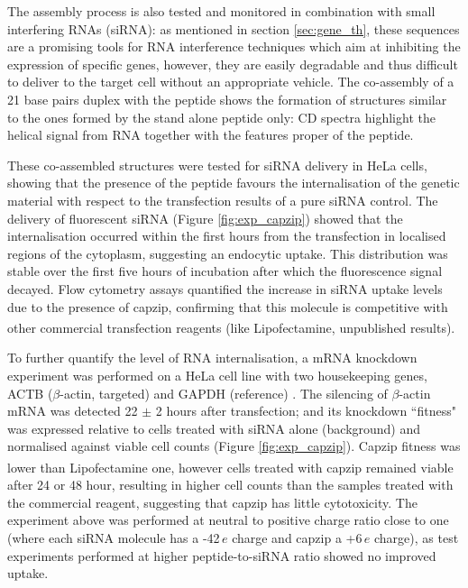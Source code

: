 The assembly process is also tested and monitored in combination with small interfering RNAs (siRNA): as mentioned in section \ref{sec:gene_th}, these sequences are a promising tools for RNA interference techniques which aim at inhibiting the expression of specific genes, however, they are easily degradable and thus difficult to deliver to the target cell without an appropriate vehicle.
%
The co-assembly of a 21 base pairs duplex with the peptide shows the formation of structures similar to the ones formed by the stand alone peptide only: CD spectra highlight the helical signal from RNA together with the features proper of the peptide.

These co-assembled structures were tested for siRNA delivery in HeLa cells, showing that the presence of the peptide favours the internalisation of the genetic material with respect to the transfection results of a pure siRNA control. The delivery of fluorescent siRNA (Figure \ref{fig:exp_capzip}) showed that the internalisation occurred within the first hours from the transfection in localised regions of the cytoplasm, suggesting an endocytic uptake. This distribution was stable over the first five hours of incubation after which the fluorescence signal decayed.
%
Flow cytometry assays quantified the increase in siRNA uptake levels due to the presence of capzip, confirming that this molecule is competitive with other commercial transfection reagents (like Lipofectamine\textsuperscript{\textregistered}, unpublished results).

To further quantify the level of RNA internalisation, a mRNA knockdown experiment was performed on a HeLa cell line with two housekeeping genes, ACTB ($\beta$-actin, targeted) and GAPDH (reference) \citep{Crombez2009}.
%
The silencing of $\beta$-actin mRNA was detected 22 $\pm$ 2 hours after transfection; and its knockdown ``fitness" was expressed relative to cells treated with siRNA alone (background) and normalised against viable cell counts (Figure \ref{fig:exp_capzip}). Capzip fitness was lower than Lipofectamine\textsuperscript{\textregistered} one, however cells treated with capzip remained viable after 24 or 48 hour, resulting in higher cell counts than the samples treated with the commercial reagent, suggesting that capzip has little cytotoxicity.
%
The experiment above was performed at neutral to positive charge ratio close to one (where each siRNA molecule has a -42$\, e$ charge and capzip a +6$\, e$ charge), as test experiments performed at higher peptide-to-siRNA ratio showed no improved uptake.

